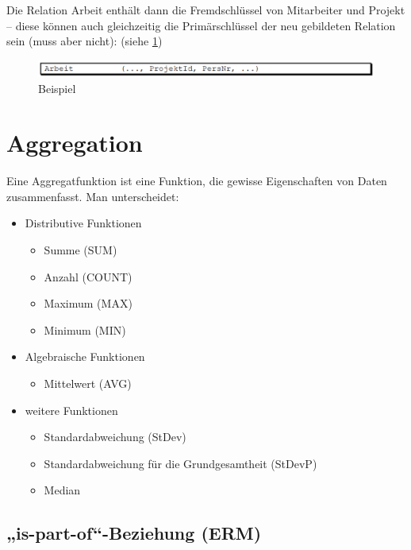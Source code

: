 Die Relation Arbeit enthält dann die Fremdschlüssel von Mitarbeiter und Projekt – diese können auch gleichzeitig die Primärschlüssel der neu gebildeten Relation sein (muss aber nicht): (siehe \ref{fig:modellierung:mitproj4})

\begin{figure}[H]
    \centering
    \includegraphics[width=.8\textwidth]{Content/images/modellierung/mitproj4.png}
    \caption{Beispiel}
    \label{fig:modellierung:mitproj4}
\end{figure}

\section{Aggregation}

Eine Aggregatfunktion ist eine Funktion, die gewisse Eigenschaften von Daten zusammenfasst.
Man unterscheidet:

\begin{itemize}
    \item Distributive Funktionen
    \begin{itemize}
        \item Summe (SUM)
        \item Anzahl (COUNT)
        \item Maximum (MAX)
        \item Minimum (MIN)
    \end{itemize}
    \item Algebraische Funktionen
    \begin{itemize}
        \item Mittelwert (AVG)
    \end{itemize}
    \item weitere Funktionen
    \begin{itemize}
        \item Standardabweichung (StDev)
        \item Standardabweichung für die Grundgesamtheit (StDevP)
        \item Median
    \end{itemize}
\end{itemize}

\subsection{„is-part-of“-Beziehung (ERM)}

